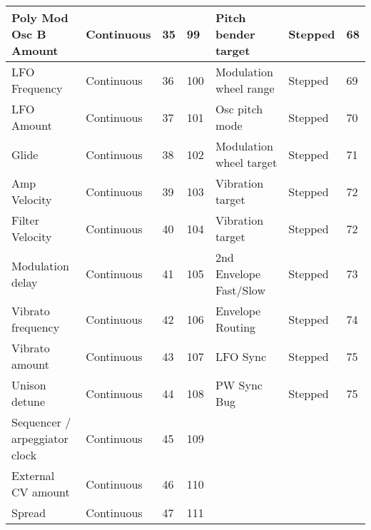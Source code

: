 \begin{longtable}[l]{ p{5cm}|p{2cm}|p{1.5cm}|p{1.5cm}|p{5cm}|p{2cm}|p{1cm}}
Poly Mod Osc B Amount & Continuous & 35 & 99 & Pitch bender target & Stepped & 68 \\ \hline
LFO Frequency & Continuous & 36 & 100 & Modulation wheel range & Stepped & 69 \\ \hline
LFO Amount & Continuous & 37 & 101 & Osc pitch mode & Stepped & 70 \\ \hline
Glide & Continuous & 38 & 102 & Modulation wheel target & Stepped & 71 \\ \hline
Amp Velocity & Continuous & 39 & 103 & Vibration target & Stepped & 72 \\ \hline
Filter Velocity & Continuous & 40 & 104 & Vibration target & Stepped & 72 \\ \hline
Modulation delay & Continuous & 41 & 105 & 2nd Envelope Fast/Slow & Stepped & 73 \\ \hline
Vibrato frequency & Continuous & 42 & 106 & Envelope Routing & Stepped & 74 \\ \hline
Vibrato amount & Continuous & 43 & 107 & LFO Sync & Stepped & 75 \\ \hline
Unison detune & Continuous & 44 & 108 & PW Sync Bug & Stepped & 75 \\ \hline
Sequencer / arpeggiator clock & Continuous & 45 & 109 &  &  &  \\ \hline
External CV amount & Continuous & 46 & 110 &  &  &  \\ \hline
Spread & Continuous & 47 & 111 &  &  &  \\ \hline 
\end{longtable}

\normalsize
